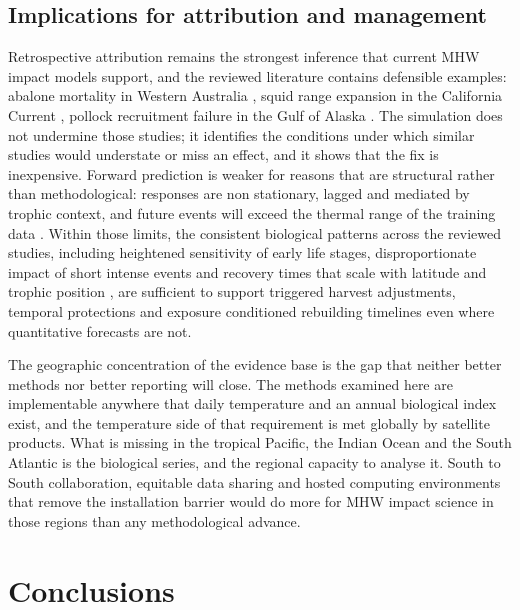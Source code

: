 \subsection{Implications for attribution and management}

Retrospective attribution remains the strongest inference that current MHW impact models support, and the reviewed literature contains defensible examples: abalone mortality in Western Australia \citep{caputi2016,hart2018}, squid range expansion in the California Current \citep{chasco2022}, pollock recruitment failure in the Gulf of Alaska \citep{rogers2021}. The simulation does not undermine those studies; it identifies the conditions under which similar studies would understate or miss an effect, and it shows that the fix is inexpensive. Forward prediction is weaker for reasons that are structural rather than methodological: responses are non stationary, lagged and mediated by trophic context, and future events will exceed the thermal range of the training data \citep{frolicher2018,welch2023}. Within those limits, the consistent biological patterns across the reviewed studies, including heightened sensitivity of early life stages, disproportionate impact of short intense events and recovery times that scale with latitude and trophic position \citep{abookire2022,guibourd2024,muhling2025}, are sufficient to support triggered harvest adjustments, temporal protections and exposure conditioned rebuilding timelines even where quantitative forecasts are not.

The geographic concentration of the evidence base is the gap that neither better methods nor better reporting will close. The methods examined here are implementable anywhere that daily temperature and an annual biological index exist, and the temperature side of that requirement is met globally by satellite products. What is missing in the tropical Pacific, the Indian Ocean and the South Atlantic is the biological series, and the regional capacity to analyse it. South to South collaboration, equitable data sharing and hosted computing environments that remove the installation barrier would do more for MHW impact science in those regions than any methodological advance.

\section{Conclusions}\label{sec:conclusions}

